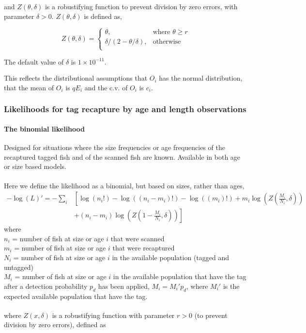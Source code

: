 {{{{and $Z \left(\theta,\delta \right)$ is a robustifying function to prevent division by zero errors, with parameter $\delta>0$. $Z \left(\theta,\delta \right)$ is defined as,

\begin{equation}
Z \left(\theta,\delta \right) = \begin{cases}
\theta, & \text{where $\theta \ge r$} \\
\delta/\left( 2-\theta/\delta \right), & \text{otherwise} \\  
\end{cases}
\end{equation}

The default value of $\delta$ is $1 \times 10^{-11}$.

This reflects the distributional assumptions that  $O_i$ has the normal distribution, that the mean of $O_i$ is $qE_i$  and the c.v. of $O_i$ is $c_i$.

\subsubsection{Likelihoods for tag recapture by age and length observations}
\paragraph*{The binomial likelihood}
Designed for situations where the size frequencies or age frequencies of the recaptured tagged fish and of the scanned fish are known. Available in both age or size based models.
\\\\
Here we define the likelihood as a binomial, but based on sizes, rather than ages,
\begin{equation}
\begin{split}
-\log \left(L \right)'= -\sum\limits_i & \left[ \right. \log \left(n_i! \right) - \log \left(\left(n_i - m_i \right)! \right) - \log \left(\left(m_i \right)! \right) + m_i \log \left(Z\left(\frac{M_i}{N_i},\delta \right) \right) \\
&+  \left(n_i - m_i \right)\log \left(Z\left(1 - \frac{M_i}{N_i},\delta\right) \right) \left. \right]
\end{split}
\end{equation}
where 
\\
$n_i$ = number of fish at size or age $i$ that were scanned
\\
$m_i$ = number of fish at size or age $i$ that were recaptured
\\
$N_i$ = number of fish at size or age $i$ in the available population (tagged and untagged)
\\
$M_i$ = number of fish at size or age $i$ in the available population that have the tag after a detection probability $p_d$ has been applied, $M_i = M_i'p_d$, where $M_i'$ is the expected available population that have the tag.
\\\\
where $Z(x,\delta)$ is a robustifying function with parameter $r > 0$ (to prevent division by zero errors), defined as


}}}}
